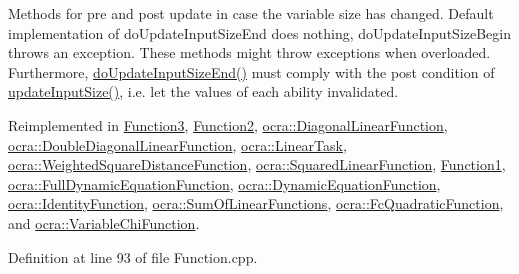 Methods for pre and post update in case the variable size has changed. Default implementation of do\+Update\+Input\+Size\+End does nothing, do\+Update\+Input\+Size\+Begin throws an exception. These methods might throw exceptions when overloaded. Furthermore, {\ttfamily \hyperlink{classocra_1_1Function_a39f6d91b72eff2d32da7e4a85ee79f7d}{do\+Update\+Input\+Size\+End()}} must comply with the post condition of {\ttfamily \hyperlink{classocra_1_1Function_a3a5b9e6ae296339acc87ab2cbf97ef98}{update\+Input\+Size()}}, i.\+e. let the values of each ability invalidated. 

Reimplemented in \hyperlink{classFunction3_a00a1ea6f2a0fdc5df66004e23038fff0}{Function3}, \hyperlink{classFunction2_ab05887e9f8995782cdc3f9399c476c4e}{Function2}, \hyperlink{classocra_1_1DiagonalLinearFunction_a2071e4c52785c88119917460b94773cb}{ocra\+::\+Diagonal\+Linear\+Function}, \hyperlink{classocra_1_1DoubleDiagonalLinearFunction_a91fd529bf34bffd327fcd545035bec67}{ocra\+::\+Double\+Diagonal\+Linear\+Function}, \hyperlink{classocra_1_1LinearTask_a9db869913d96b6917b2d40211761c019}{ocra\+::\+Linear\+Task}, \hyperlink{classocra_1_1WeightedSquareDistanceFunction_aff6adfc9daa9242233f58a8c2c16ba7d}{ocra\+::\+Weighted\+Square\+Distance\+Function}, \hyperlink{classocra_1_1SquaredLinearFunction_a95faea59867ec734fbdb46d936067d77}{ocra\+::\+Squared\+Linear\+Function}, \hyperlink{classFunction1_aec0bc51f050a1bd32cece26e524e5c97}{Function1}, \hyperlink{group__constraint_gadbdce52af8ba057e93ea923db5a3ce04}{ocra\+::\+Full\+Dynamic\+Equation\+Function}, \hyperlink{classocra_1_1DynamicEquationFunction_a6fc52fcd947fa303e55729dbb286b92c}{ocra\+::\+Dynamic\+Equation\+Function}, \hyperlink{classocra_1_1IdentityFunction_aa8d5ff0e25422b3b5a4a2a8621120790}{ocra\+::\+Identity\+Function}, \hyperlink{classocra_1_1SumOfLinearFunctions_a7cfc7b9339509922c2ea6173d4d4d141}{ocra\+::\+Sum\+Of\+Linear\+Functions}, \hyperlink{classocra_1_1FcQuadraticFunction_a1e350f138eb82cfe3e8cf049942e626c}{ocra\+::\+Fc\+Quadratic\+Function}, and \hyperlink{classocra_1_1VariableChiFunction_ad58b8fbb68e8cb27aab585f40875918f}{ocra\+::\+Variable\+Chi\+Function}.



Definition at line 93 of file Function.\+cpp.

\hypertarget{classocra_1_1Function_a39f6d91b72eff2d32da7e4a85ee79f7d}{}\label{classocra_1_1Function_a39f6d91b72eff2d32da7e4a85ee79f7d} 

